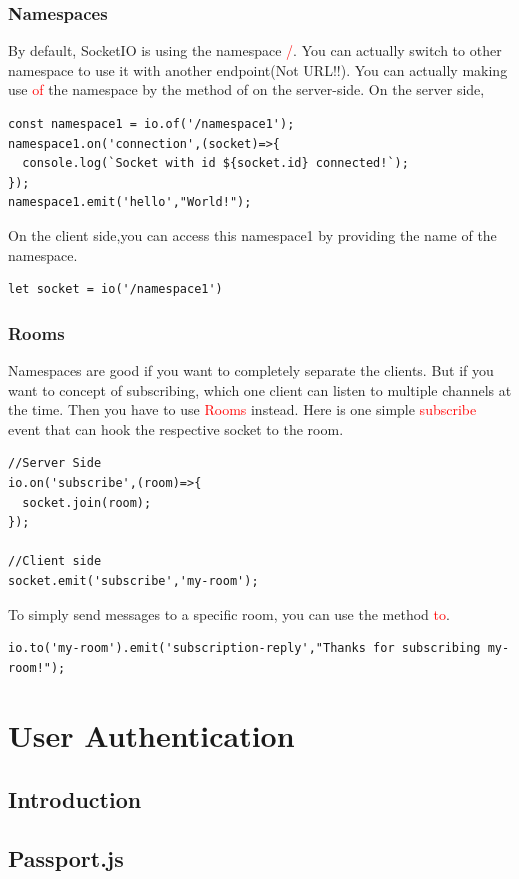 \documentclass[a4paper]{article}
\begin{document}
\subsubsection{Namespaces}
By default, SocketIO is using the namespace \textcolor{red}{/}. You can actually switch to other namespace to use it with another endpoint(Not URL!!). You can actually making use \textcolor{red}{of} the namespace by the method of on the server-side. On the server side,
\begin{lstlisting}
const namespace1 = io.of('/namespace1');  
namespace1.on('connection',(socket)=>{
  console.log(`Socket with id ${socket.id} connected!`);
});
namespace1.emit('hello',"World!");
\end{lstlisting}
On the client side,you can access this namespace1 by providing the name of the namespace.
\begin{lstlisting}
let socket = io('/namespace1')
\end{lstlisting}
\subsubsection{Rooms}
Namespaces are good if you want to completely separate the clients. But if you want to concept of subscribing, which one client can listen to multiple channels at the time. Then you have to use \textcolor{red}{Rooms} instead. Here is one simple \textcolor{red}{subscribe} event that can hook the respective socket to the room.
\begin{lstlisting}
//Server Side
io.on('subscribe',(room)=>{
  socket.join(room);
});

//Client side
socket.emit('subscribe','my-room');
\end{lstlisting}
To simply send messages to a specific room, you can use the method \textcolor{red}{to}.

\begin{lstlisting}
io.to('my-room').emit('subscription-reply',"Thanks for subscribing my-room!");
\end{lstlisting}


\section{User Authentication}
\subsection{Introduction}
\subsection{Passport.js}
\end{document}

